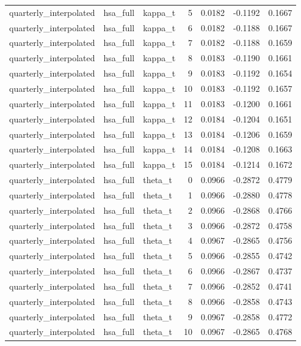 \begin{tabular}{lllrrrr}
quarterly\_interpolated & hsa\_full & kappa\_t & 5 & 0.0182 & -0.1192 & 0.1667 \\
quarterly\_interpolated & hsa\_full & kappa\_t & 6 & 0.0182 & -0.1188 & 0.1667 \\
quarterly\_interpolated & hsa\_full & kappa\_t & 7 & 0.0182 & -0.1188 & 0.1659 \\
quarterly\_interpolated & hsa\_full & kappa\_t & 8 & 0.0183 & -0.1190 & 0.1661 \\
quarterly\_interpolated & hsa\_full & kappa\_t & 9 & 0.0183 & -0.1192 & 0.1654 \\
quarterly\_interpolated & hsa\_full & kappa\_t & 10 & 0.0183 & -0.1192 & 0.1657 \\
quarterly\_interpolated & hsa\_full & kappa\_t & 11 & 0.0183 & -0.1200 & 0.1661 \\
quarterly\_interpolated & hsa\_full & kappa\_t & 12 & 0.0184 & -0.1204 & 0.1651 \\
quarterly\_interpolated & hsa\_full & kappa\_t & 13 & 0.0184 & -0.1206 & 0.1659 \\
quarterly\_interpolated & hsa\_full & kappa\_t & 14 & 0.0184 & -0.1208 & 0.1663 \\
quarterly\_interpolated & hsa\_full & kappa\_t & 15 & 0.0184 & -0.1214 & 0.1672 \\
quarterly\_interpolated & hsa\_full & theta\_t & 0 & 0.0966 & -0.2872 & 0.4779 \\
quarterly\_interpolated & hsa\_full & theta\_t & 1 & 0.0966 & -0.2880 & 0.4778 \\
quarterly\_interpolated & hsa\_full & theta\_t & 2 & 0.0966 & -0.2868 & 0.4766 \\
quarterly\_interpolated & hsa\_full & theta\_t & 3 & 0.0966 & -0.2872 & 0.4758 \\
quarterly\_interpolated & hsa\_full & theta\_t & 4 & 0.0967 & -0.2865 & 0.4756 \\
quarterly\_interpolated & hsa\_full & theta\_t & 5 & 0.0966 & -0.2855 & 0.4742 \\
quarterly\_interpolated & hsa\_full & theta\_t & 6 & 0.0966 & -0.2867 & 0.4737 \\
quarterly\_interpolated & hsa\_full & theta\_t & 7 & 0.0966 & -0.2852 & 0.4741 \\
quarterly\_interpolated & hsa\_full & theta\_t & 8 & 0.0966 & -0.2858 & 0.4743 \\
quarterly\_interpolated & hsa\_full & theta\_t & 9 & 0.0967 & -0.2858 & 0.4772 \\
quarterly\_interpolated & hsa\_full & theta\_t & 10 & 0.0967 & -0.2865 & 0.4768 \\

\end{tabular}
